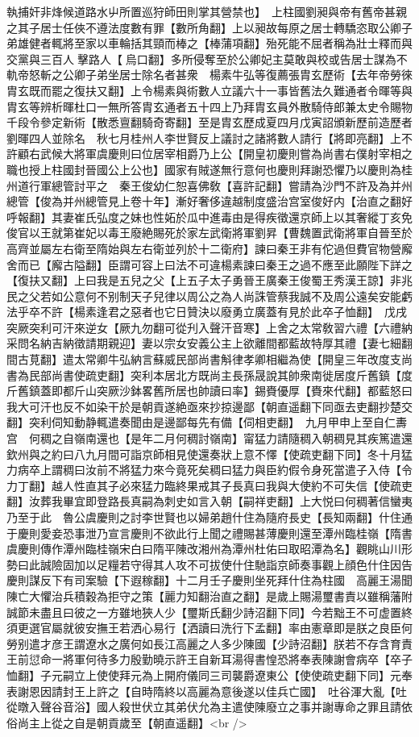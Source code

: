 執捕奸非烽候道路水屮所置巡狩師田則掌其營禁也】　上柱國劉昶與帝有舊帝甚親之其子居士任俠不遵法度數有罪【數所角翻】上以昶故每原之居士轉驕恣取公卿子弟雄健者輒將至家以車輪括其頸而棒之【棒蒲項翻】殆死能不屈者稱為壯士釋而與交黨與三百人擊路人【烏口翻】多所侵奪至於公卿妃主莫敢與校或告居士謀為不軌帝怒斬之公卿子弟坐居士除名者甚衆　楊素牛弘等復薦張胄玄歷術【去年帝勞徠胄玄既而罷之復扶又翻】上令楊素與術數人立議六十一事皆舊法久難通者令暉等與胄玄等辨析暉杜口一無所答胄玄通者五十四上乃拜胄玄員外散騎侍郎兼太史令賜物千段令參定新術【散悉亶翻騎奇寄翻】至是胄玄歷成夏四月戊寅詔頒新歷前造歷者劉暉四人並除名　秋七月桂州人李世賢反上議討之諸將數人請行【將即亮翻】上不許顧右武候大將軍虞慶則曰位居宰相爵乃上公【開皇初慶則嘗為尚書右僕射宰相之職也授上柱國封晉國公上公也】國家有賊遂無行意何也慶則拜謝恐懼乃以慶則為桂州道行軍總管討平之　秦王俊幼仁恕喜佛敎【喜許記翻】嘗請為沙門不許及為并州總管【俊為并州總管見上卷十年】漸好奢侈違越制度盛治宫室俊好内【治直之翻好呼報翻】其妻崔氏弘度之妹也性妬於瓜中進毒由是得疾徵還京師上以其奢縱丁亥免俊官以王就第崔妃以毒王廢絶賜死於家左武衛將軍劉昇【曹魏置武衛將軍自晉至於高齊並屬左右衛至隋始與左右衛並列於十二衛府】諫曰秦王非有佗過但費官物營廨舍而已【廨古隘翻】臣謂可容上曰法不可違楊素諫曰秦王之過不應至此願陛下詳之【復扶又翻】上曰我是五兒之父【上五子太子勇晉王廣秦王俊蜀王秀漢王諒】非兆民之父若如公意何不别制天子兒律以周公之為人尚誅管蔡我誠不及周公遠矣安能虧法乎卒不許【楊素逢君之惡者也它日贊決以廢勇立廣蓋有見於此卒子恤翻】　戊戌突厥突利可汗來逆女【厥九勿翻可從刋入聲汗音寒】上舍之太常敎習六禮【六禮納采問名納吉納徵請期親迎】妻以宗女安義公主上欲離間都藍故特厚其禮【妻七細翻間古莧翻】遣太常卿牛弘納言蘇威民部尚書斛律孝卿相繼為使【開皇三年改度支尚書為民部尚書使疏吏翻】突利本居北方既尚主長孫晟說其帥衆南徙居度斤舊鎮【度斤舊鎮蓋即都斤山突厥沙鉢畧舊所居也帥讀曰率】錫賚優厚【賚來代翻】都藍怒曰我大可汗也反不如染干於是朝貢遂絶亟來抄掠邊鄙【朝直遥翻下同亟去吏翻抄楚交翻】突利伺知動静輒遣奏聞由是邊鄙每先有備【伺相吏翻】　九月甲申上至自仁夀宫　何稠之自嶺南還也【是年二月何稠討嶺南】甯猛力請隨稠入朝稠見其疾篤遣還欽州與之約曰八九月間可詣京師相見使還奏狀上意不懌【使疏吏翻下同】冬十月猛力病卒上謂稠曰汝前不將猛力來今竟死矣稠曰猛力與臣約假令身死當遣子入侍【令力丁翻】越人性直其子必來猛力臨終果戒其子長真曰我與大使約不可失信【使疏吏翻】汝葬我畢宜即登路長真嗣為刺史如言入朝【嗣祥吏翻】上大悦曰何稠著信蠻夷乃至于此　魯公虞慶則之討李世賢也以婦弟趙什住為隨府長史【長知兩翻】什住通于慶則愛妾恐事泄乃宣言慶則不欲此行上聞之禮賜甚薄慶則還至潭州臨桂嶺【隋書虞慶則傳作潭州臨桂嶺宋白曰隋平陳改湘州為潭州杜佑曰取昭潭為名】觀眺山川形勢曰此誠險固加以足糧若守得其人攻不可拔使什住馳詣京師奏事觀上顔色什住因告慶則謀反下有司案驗【下遐稼翻】十二月壬子慶則坐死拜什住為柱國　高麗王湯聞陳亡大懼治兵積穀為拒守之策【麗力知翻治直之翻】是歲上賜湯璽書責以雖稱藩附誠節未盡且曰彼之一方雖地狹人少【璽斯氏翻少詩沼翻下同】今若黜王不可虚置終須更選官屬就彼安撫王若洒心易行【洒讀曰洗行下孟翻】率由憲章即是朕之良臣何勞别遣才彦王謂遼水之廣何如長江高麗之人多少陳國【少詩沼翻】朕若不存含育責王前愆命一將軍何待多力殷勤曉示許王自新耳湯得書惶恐將奉表陳謝會病卒【卒子恤翻】子元嗣立上使使拜元為上開府儀同三司襲爵遼東公【使使疏吏翻下同】元奉表謝恩因請封王上許之【自時隋終以高麗為意後遂以佳兵亡國】　吐谷渾大亂【吐從暾入聲谷音浴】國人殺世伏立其弟伏允為主遣使陳廢立之事并謝專命之罪且請依俗尚主上從之自是朝貢歲至【朝直遥翻】<br />
